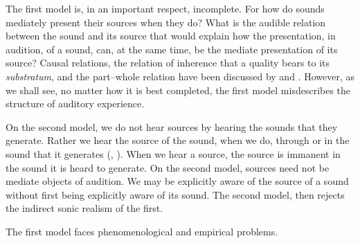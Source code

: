 \documentclass[12pt]{article}
\begin{document}
The first model is, in an important respect, incomplete. For how do sounds mediately present their sources when they do? What is the audible relation between the sound and its source that would explain how the presentation, in audition, of a sound, can, at the same time, be the mediate presentation of its source? Causal relations, the relation of inherence that a quality bears to its \emph{substratum}, and the part--whole relation have been discussed by \citet{Leddington:2014aa} and \citet{OCallaghan:2011az}. However, as we shall see, no matter how it is best completed, the first model misdescribes the structure of auditory experience.

On the second model, we do not hear sources by hearing the sounds that they generate. Rather we hear the source of the sound, when we do, through or in the sound that it generates (\citealt{Leddington:2014aa}, \citealt[chapter 4]{Kalderon:2018oe}). When we hear a source, the source is immanent in the sound it is heard to generate. On the second model, sources need not be mediate objects of audition. We may be explicitly aware of the source of a sound without first being explicitly aware of its sound. The second model, then rejects the indirect sonic realism of the first.

The first model faces phenomenological and empirical problems.
\end{document}
